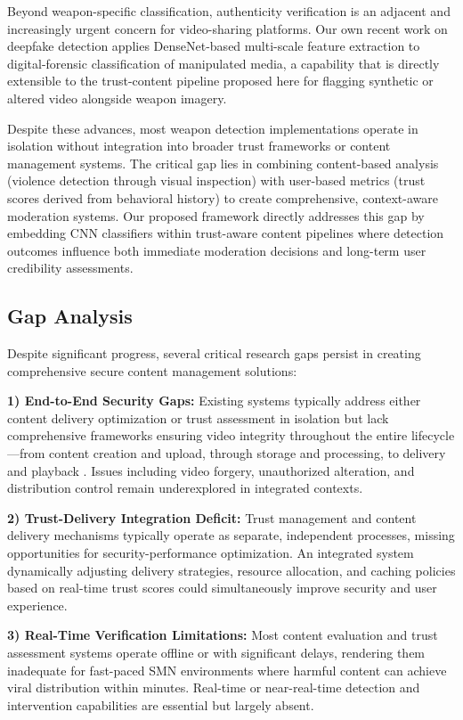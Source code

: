 \documentclass[conference]{IEEEtran}
\begin{document}
Beyond weapon-specific classification, authenticity verification is an adjacent and increasingly urgent concern for video-sharing platforms. Our own recent work on deepfake detection \cite{chowdhury2025deepfake} applies DenseNet-based multi-scale feature extraction to digital-forensic classification of manipulated media, a capability that is directly extensible to the trust-content pipeline proposed here for flagging synthetic or altered video alongside weapon imagery.

Despite these advances, most weapon detection implementations operate in isolation without integration into broader trust frameworks or content management systems. The critical gap lies in combining content-based analysis (violence detection through visual inspection) with user-based metrics (trust scores derived from behavioral history) to create comprehensive, context-aware moderation systems. Our proposed framework directly addresses this gap by embedding CNN classifiers within trust-aware content pipelines where detection outcomes influence both immediate moderation decisions and long-term user credibility assessments.

\subsection{Gap Analysis}

Despite significant progress, several critical research gaps persist in creating comprehensive secure content management solutions:

\textbf{1) End-to-End Security Gaps:} Existing systems typically address either content delivery optimization or trust assessment in isolation but lack comprehensive frameworks ensuring video integrity throughout the entire lifecycle—from content creation and upload, through storage and processing, to delivery and playback \cite{hall2012trustworthiness}. Issues including video forgery, unauthorized alteration, and distribution control remain underexplored in integrated contexts.

\textbf{2) Trust-Delivery Integration Deficit:} Trust management and content delivery mechanisms typically operate as separate, independent processes, missing opportunities for security-performance optimization. An integrated system dynamically adjusting delivery strategies, resource allocation, and caching policies based on real-time trust scores could simultaneously improve security and user experience.

\textbf{3) Real-Time Verification Limitations:} Most content evaluation and trust assessment systems operate offline or with significant delays, rendering them inadequate for fast-paced SMN environments where harmful content can achieve viral distribution within minutes. Real-time or near-real-time detection and intervention capabilities are essential but largely absent.
\end{document}
